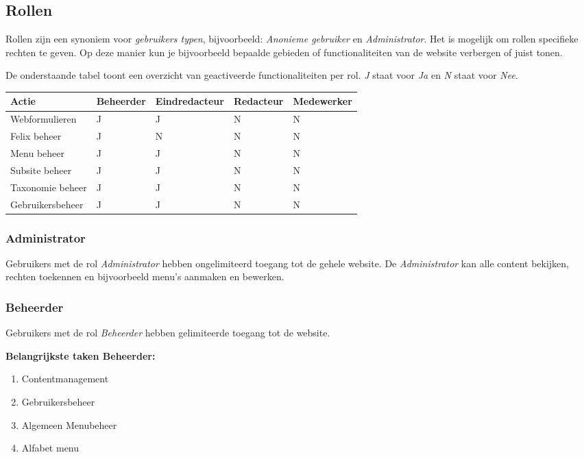 \subsection{Rollen}\label{rollen}

Rollen zijn een synoniem voor \emph{gebruikers typen}, bijvoorbeeld: \emph{Anonieme gebruiker} en \emph{Administrator}.  Het is mogelijk om rollen specifieke rechten te geven. Op deze manier kun je bijvoorbeeld bepaalde gebieden of functionaliteiten van de website verbergen of juist tonen. 

De onderstaande tabel toont een overzicht van geactiveerde functionaliteiten per rol.
\emph{J} staat voor \emph{Ja} en \emph{N} staat voor \emph{Nee}. 

\begin{tabularx}{\textwidth}{ | p{5cm} |X|X|X|X| }
  \hline
  Actie & Beheerder & Eindredacteur & Redacteur & Medewerker \\ \hline
  Webformulieren  & J  & J  & N & N  \\ \hline
  Felix beheer  & J  & N  & N & N  \\ \hline
  Menu beheer  & J  & J  & N & N  \\ \hline
  Subsite beheer  & J  & J  & N & N  \\ \hline
  Taxonomie beheer  & J  & J  & N & N  \\ \hline
  Gebruikersbeheer  & J  & J  & N & N  \\ \hline
\end{tabularx}


\subsubsection{Administrator}\label{administrator}
Gebruikers met de rol \emph{Administrator} hebben ongelimiteerd toegang tot de gehele website. De \emph{Administrator} kan alle content bekijken, rechten toekennen en bijvoorbeeld menu's aanmaken en bewerken.

\subsubsection{Beheerder}\label{beheerder}
Gebruikers met de rol \emph{Beheerder} hebben gelimiteerde toegang tot de website. 

\textbf{Belangrijkste taken Beheerder:}

\begin{enumerate}
\item Contentmanagement
\item Gebruikersbeheer
\item Algemeen Menubeheer
\item Alfabet menu
\end{enumerate}

